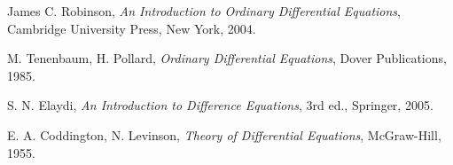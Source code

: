 \documentclass{arabicClass}
\begin{document}
	\renewcommand{\jot}{7pt}
	\abovedisplayskip=7pt
	\belowdisplayskip=7pt
	
	\renewcommand{\theequation}{\arabic{equation}.\arabic{chapter}}
	
	
	\amirifont
	
	
	
   \arabicfont
	\tableofcontents
   \clearpage
	
	
	
	
	
	
	
	
	
	\begin{thebibliography}{9}
		\begin{english}
		James C. Robinson, \textit{An Introduction to Ordinary Differential Equations}, Cambridge University Press, New York, 2004.
		
		M. Tenenbaum, H. Pollard, \textit{Ordinary Differential Equations}, Dover Publications, 1985.
		
		S. N. Elaydi, \textit{An Introduction to Difference Equations}, 3rd ed., Springer, 2005.
		
		E. A. Coddington, N. Levinson, \textit{Theory of Differential Equations}, McGraw-Hill, 1955.
		\end{english}
	\end{thebibliography}
\end{document}

